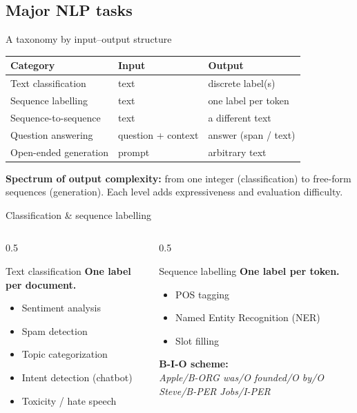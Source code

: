 \documentclass[11pt,aspectratio=169]{beamer}
\begin{document}
\subsection{Major NLP tasks}

\begin{frame}{A taxonomy by input--output structure}
\begin{center}
\begin{tabular}{|l|l|l|}
\hline
\textbf{Category} & \textbf{Input} & \textbf{Output} \\
\hline
Text classification & text & discrete label(s) \\
Sequence labelling & text & one label per token \\
Sequence-to-sequence & text & a different text \\
Question answering & question + context & answer (span / text) \\
Open-ended generation & prompt & arbitrary text \\
\hline
\end{tabular}
\end{center}
\vfill
\textbf{Spectrum of output complexity:} from one integer (classification) to free-form sequences (generation). Each level adds expressiveness and evaluation difficulty.
\end{frame}

\begin{frame}{Classification \& sequence labelling}
\begin{columns}[T]
\begin{column}{0.5\textwidth}
\begin{block}{Text classification}
\textbf{One label per document.}
\begin{itemize}
    \item Sentiment analysis
    \item Spam detection
    \item Topic categorization
    \item Intent detection (chatbot)
    \item Toxicity / hate speech
\end{itemize}
\end{block}
\end{column}
\begin{column}{0.5\textwidth}
\begin{block}{Sequence labelling}
\textbf{One label per token.}
\begin{itemize}
    \item POS tagging
    \item Named Entity Recognition (NER)
    \item Slot filling
\end{itemize}
\textbf{B-I-O scheme:}\\
\emph{Apple/B-ORG was/O founded/O by/O Steve/B-PER Jobs/I-PER}
\end{block}
\end{column}
\end{columns}
\end{frame}
\end{document}

